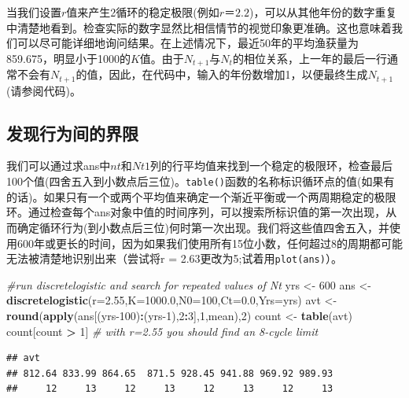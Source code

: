 \documentclass[
  lang=cn,
  11pt,
  scheme=chinese,
  chinesefont=nofont,
  citestyle=gb7714-2015,
  bibstyle=gb7714-2015]{elegantbook}
\newenvironment{Shaded}{\begin{snugshade}}{\end{snugshade}}
\newcommand{\AttributeTok}[1]{\textcolor[rgb]{0.13,0.29,0.53}{#1}}
\newcommand{\CommentTok}[1]{\textcolor[rgb]{0.56,0.35,0.01}{\textit{#1}}}
\newcommand{\DecValTok}[1]{\textcolor[rgb]{0.00,0.00,0.81}{#1}}
\newcommand{\FloatTok}[1]{\textcolor[rgb]{0.00,0.00,0.81}{#1}}
\newcommand{\FunctionTok}[1]{\textcolor[rgb]{0.13,0.29,0.53}{\textbf{#1}}}
\newcommand{\NormalTok}[1]{#1}
\newcommand{\OtherTok}[1]{\textcolor[rgb]{0.56,0.35,0.01}{#1}}
\newcommand{\SpecialCharTok}[1]{\textcolor[rgb]{0.81,0.36,0.00}{\textbf{#1}}}
\begin{document}
当我们设置\(r\)值来产生2循环的稳定极限(例如\(r＝2.2\))，可以从其他年份的数字重复中清楚地看到。检查实际的数字显然比相信情节的视觉印象更准确。这也意味着我们可以尽可能详细地询问结果。在上述情况下，最近50年的平均渔获量为859.675，明显小于1000的\(K\)值。由于\(N_{t+1}\)与\(N_t\)的相位关系，上一年的最后一行通常不会有\(N_{t+1}\)的值，因此，在代码中，输入的年份数增加1，以便最终生成\(N_{t+1}\)(请参阅代码)。

\subsection{发现行为间的界限}\label{ux53d1ux73b0ux884cux4e3aux95f4ux7684ux754cux9650}

我们可以通过求ans中\(nt\)和\(Nt1\)列的行平均值来找到一个稳定的极限环，检查最后100个值(四舍五入到小数点后三位)。\texttt{table()}函数的名称标识循环点的值(如果有的话)。如果只有一个或两个平均值来确定一个渐近平衡或一个两周期稳定的极限环。通过检查每个ans对象中值的时间序列，可以搜索所标识值的第一次出现，从而确定循环行为(到小数点后三位)何时第一次出现。我们将这些值四舍五入，并使用600年或更长的时间，因为如果我们使用所有15位小数，任何超过8的周期都可能无法被清楚地识别出来（尝试将r = 2.63更改为5;试着用\texttt{plot(ans)}）。

\begin{Shaded}
\begin{Highlighting}[]
 \CommentTok{\#run discretelogistic and search for repeated values of Nt  }
\NormalTok{yrs }\OtherTok{\textless{}{-}} \DecValTok{600}  
\NormalTok{ans }\OtherTok{\textless{}{-}} \FunctionTok{discretelogistic}\NormalTok{(}\AttributeTok{r=}\FloatTok{2.55}\NormalTok{,}\AttributeTok{K=}\FloatTok{1000.0}\NormalTok{,}\AttributeTok{N0=}\DecValTok{100}\NormalTok{,}\AttributeTok{Ct=}\FloatTok{0.0}\NormalTok{,}\AttributeTok{Yrs=}\NormalTok{yrs)  }
\NormalTok{avt }\OtherTok{\textless{}{-}} \FunctionTok{round}\NormalTok{(}\FunctionTok{apply}\NormalTok{(ans[(yrs}\DecValTok{{-}100}\NormalTok{)}\SpecialCharTok{:}\NormalTok{(yrs}\DecValTok{{-}1}\NormalTok{),}\DecValTok{2}\SpecialCharTok{:}\DecValTok{3}\NormalTok{],}\DecValTok{1}\NormalTok{,mean),}\DecValTok{2}\NormalTok{)  }
\NormalTok{count }\OtherTok{\textless{}{-}} \FunctionTok{table}\NormalTok{(avt)  }
\NormalTok{count[count }\SpecialCharTok{\textgreater{}} \DecValTok{1}\NormalTok{] }\CommentTok{\# with r=2.55 you should find an 8{-}cycle limit  }
\end{Highlighting}
\end{Shaded}

\begin{verbatim}
## avt
## 812.64 833.99 864.65  871.5 928.45 941.88 969.92 989.93 
##     12     13     12     13     12     13     12     13
\end{verbatim}
\end{document}

